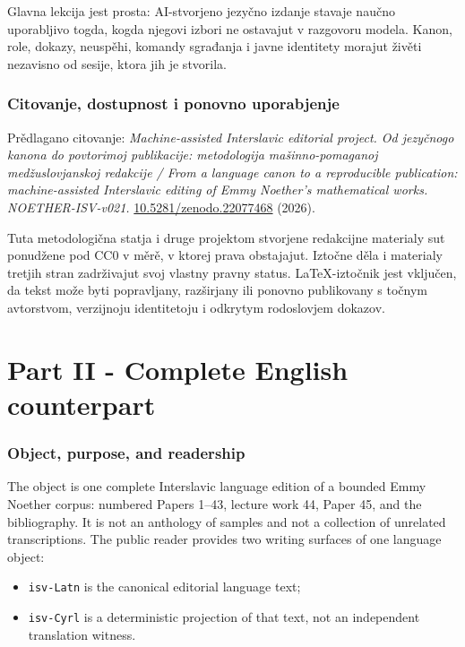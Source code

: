 \documentclass[11pt]{article}
\newcommand{\code}[1]{\texttt{#1}}
\newcommand{\doiurl}[1]{\href{https://doi.org/#1}{#1}}
\begin{document}
Glavna lekcija jest prosta: AI-stvorjeno jezyčno izdanje stavaje naučno uporabljivo togda, kogda njegovi izbori ne ostavajut v razgovoru modela. Kanon, role, dokazy, neuspěhi, komandy sgrađanja i javne identitety morajut živěti nezavisno od sesije, ktora jih je stvorila.

\section*{Citovanje, dostupnost i ponovno uporabjenje}

Prědlagano citovanje: \emph{Machine-assisted Interslavic editorial project. Od jezyčnogo kanona do povtorimoj publikacije: metodologija mašinno-pomaganoj medžuslovjanskoj redakcije / From a language canon to a reproducible publication: machine-assisted Interslavic editing of Emmy Noether's mathematical works. NOETHER-ISV-v021.} \doiurl{10.5281/zenodo.22077468} (2026).

Tuta metodologična statja i druge projektom stvorjene redakcijne materialy sut ponudžene pod CC0 v měrě, v ktorej prava obstajajut. Iztočne děla i materialy tretjih stran zadrživajut svoj vlastny pravny status. LaTeX-iztočnik jest vključen, da tekst može byti popravljany, razširjany ili ponovno publikovany s točnym avtorstvom, verzijnoju identitetoju i odkrytym rodoslovjem dokazov.

\clearpage
\part*{Part II - Complete English counterpart}

\section{Object, purpose, and readership}

The object is one complete Interslavic language edition of a bounded Emmy Noether corpus: numbered Papers 1--43, lecture work 44, Paper 45, and the bibliography. It is not an anthology of samples and not a collection of unrelated transcriptions. The public reader provides two writing surfaces of one language object:

\begin{itemize}
\item \code{isv-Latn} is the canonical editorial language text;
\item \code{isv-Cyrl} is a deterministic projection of that text, not an independent translation witness.
\end{itemize}
\end{document}
